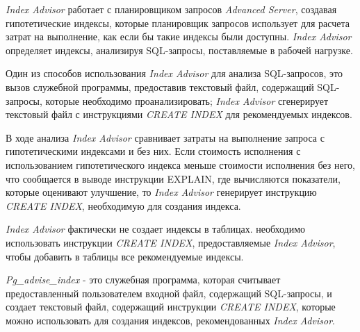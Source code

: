 \textit{Index Advisor} работает с планировщиком запросов \textit{Advanced Server}, создавая гипотетические индексы, которые планировщик запросов использует для расчета затрат на выполнение, как если бы такие индексы были доступны. \textit{Index Advisor} определяет индексы, анализируя SQL-запросы, поставляемые в рабочей нагрузке.

Один из способов использования \textit{Index Advisor}  для анализа SQL-запросов, это вызов служебной программы, предоставив текстовый файл, содержащий SQL-запросы, которые необходимо проанализировать; \textit{Index Advisor} сгенерирует текстовый файл с инструкциями \textit{CREATE INDEX} для рекомендуемых индексов.

В ходе анализа \textit{Index Advisor} сравнивает затраты на выполнение запроса с гипотетическими индексами и без них. Если стоимость исполнения с использованием гипотетического индекса меньше стоимости исполнения без него, что сообщается в выводе инструкции EXPLAIN, где вычисляются показатели, которые оценивают улучшение, то \textit{Index Advisor} генерирует инструкцию \textit{CREATE INDEX}, необходимую для создания индекса.

\textit{Index Advisor} фактически не создает индексы в таблицах. необходимо использовать инструкции \textit{CREATE INDEX}, предоставляемые \textit{Index Advisor}, чтобы добавить в таблицы все рекомендуемые индексы.

\textit{Pg_advise_index} - это служебная программа, которая считывает предоставленный пользователем входной файл, содержащий SQL-запросы, и создает текстовый файл, содержащий инструкции \textit{CREATE INDEX}, которые можно использовать для создания индексов, рекомендованных \textit{Index Advisor}.


